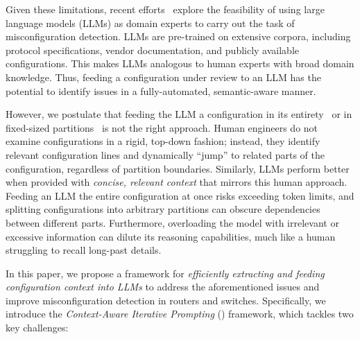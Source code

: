 Given these limitations, recent efforts~\cite{bogdanov2024leveraging,chen2024automatic,wang2024identifying,liu2024large, wang2024netconfeval, lian2023configuration} explore the feasibility of using large language models (LLMs) as domain experts to carry out the task of misconfiguration detection. LLMs are pre-trained on extensive corpora,
including protocol specifications, vendor documentation, and publicly available configurations. This makes LLMs analogous to human experts with broad domain knowledge. Thus, feeding a configuration under review to an LLM
has the potential to identify issues in a fully-automated, semantic-aware manner.

However, we postulate that feeding the LLM a configuration in its entirety~\cite{xue2024repeat,yu2024breaking,gu2023mamba,lican,li2024long,qian2024long} 
or in fixed-sized partitions~\cite{lian2023configuration} is not the right approach. %
Human engineers do not examine configurations in a rigid, top-down fashion; instead, they identify relevant configuration lines and dynamically ``jump'' to related parts of the configuration, regardless of partition boundaries. Similarly, LLMs perform better when provided with {\em concise, relevant context} that mirrors this human approach. Feeding an LLM the entire configuration at once risks exceeding token limits, and splitting configurations into arbitrary partitions can obscure dependencies between different parts. Furthermore, overloading the model with irrelevant or excessive information can dilute its reasoning capabilities, much like a human struggling to recall long-past details.

In this paper, we propose a framework for {\em efficiently extracting and feeding configuration context into LLMs} to address the aforementioned issues and improve misconfiguration detection in routers and switches. Specifically, we introduce the \emph{Context-Aware Iterative Prompting} (\sysname{}) framework, which tackles two key challenges:

